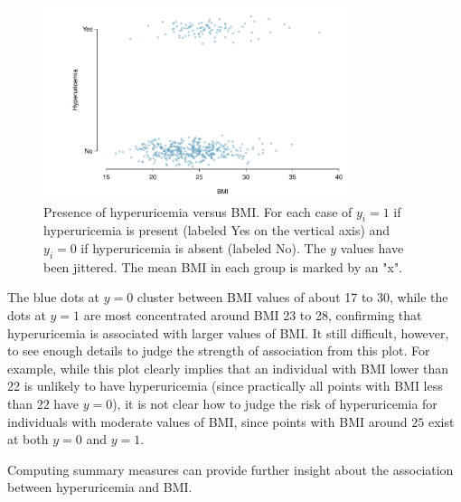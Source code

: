     \begin{figure}[h!]
        \centering
        \includegraphics[width=0.80\textwidth]
        {ch_logistic_regression_oi_biostat/figures/bmiHuProbSecondTile/bmiHuProbSecondTileDataOnly.pdf}
         \caption{Presence of hyperuricemia versus BMI. For each case of $y_i = 1$ if hyperuricemia is present (labeled Yes on the vertical axis) and $y_i = 0$ if hyperuricemia is absent (labeled No). The $y$ values have been jittered. The mean BMI in each group is marked by an "x".}
         \label{figure:bmiHuProbSecondTileDataOnly}
     \end{figure}

The blue dots at $y = 0$ cluster between BMI values of about 17 to 30, while the dots at $y = 1$ are most concentrated around BMI 23 to 28, confirming that  hyperuricemia is associated with larger values of BMI. It still difficult, however, to see enough details to judge the strength of association from this plot. For example, while this plot clearly implies that an individual with BMI lower than 22 is unlikely to have hyperuricemia (since practically all points with BMI less than $22$ have $y = 0$), it is not clear how to judge the risk of hyperuricemia for individuals with moderate values of BMI, since points with BMI around $25$ exist at both $y = 0$ and $y = 1$.

Computing summary measures can provide further insight about the association between hyperuricemia and BMI.

